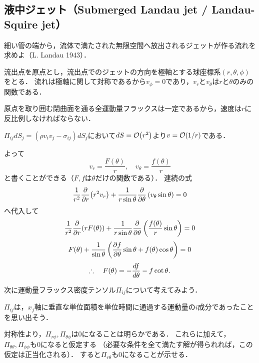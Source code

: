 





\setcounter{equation}{15}


\subsection*{液中ジェット（Submerged Landau jet / Landau-Squire jet）}

\begin{myitembox}
細い管の端から，流体で満たされた無限空間へ放出されるジェットが作る流れを求めよ（L. Landau 1943）．
\end{myitembox}

流出点を原点とし，流出点でのジェットの方向を極軸とする球座標系$(r,\theta,\phi)$をとる．
流れは極軸に関して対称であるから$v_\phi=0$であり，$v_r$と$v_\theta$は$r$と$\theta$のみの関数である．

原点を取り囲む閉曲面を通る全運動量フラックスは一定であるから，速度は$r$に反比例しなければならない．
\begin{details}
$\varPi_{ij}dS_j = (\rho v_iv_j - \sigma_{ij}) dS_j$において$dS = \order{r^2}$より$v=\order{1/r}$である．
\end{details}
\noindent%
よって
\begin{equation}\label{eq23.16:Landau jet fとFの定義}
    v_r = \frac{F(\theta)}{r}, \quad 
    v_\theta = \frac{f(\theta)}{r}
\end{equation}
と書くことができる（$F,f$は$\theta$だけの関数である）．
連続の式
\[
    \frac{1}{r^2} \pdv{r} (r^2 v_r) + \frac{1}{r\sin\theta} \pdv{\theta} \left(v_\theta \sin\theta \right) = 0
\]
へ代入して
\[
    \frac{1}{r^2} \pdv{r} (rF(\theta)) + \frac{1}{r\sin\theta} \pdv{\theta} \left( \frac{f(\theta)}{r} \sin\theta \right) = 0
\]
\[
    F(\theta) + \frac{1}{\sin\theta} \left( \pdv{f}{\theta} \sin\theta + f(\theta) \cos\theta \right) = 0
\]
\begin{equation}\label{eq23.17:Landau jet Fとfの式}
    \therefore\quad F(\theta) = - \dv{f}{\theta} - f \cot \theta.  
\end{equation}


次に運動量フラックス密度テンソル$\varPi_{ij}$について考えてみよう．
\begin{details}
$\varPi_{ij}$は，$x_j$軸に垂直な単位面積を単位時間に通過する運動量の$i$成分であったことを思い出そう．
\end{details}
\noindent%
対称性より，$\varPi_{r\phi}, \varPi_{\theta\phi}$は0になることは明らかである．
これらに加えて，$\varPi_{\theta\theta}, \varPi_{\phi\phi}$も0になると仮定する
（必要な条件を全て満たす解が得られれば，この仮定は正当化される）．
すると$\varPi_{r\theta}$も0になることが示せる．

